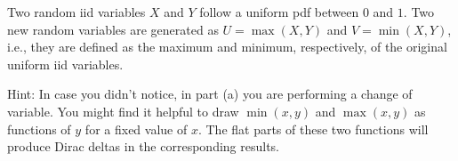 \else

\question[25] %

Two random iid variables $X$ and $Y$ follow a uniform pdf between $0$ and $1$. Two new random variables are generated as $U = \max(X,Y)$ and $V = \min(X,Y)$, i.e., they are defined as the maximum  and minimum, respectively, of the original uniform iid variables.


Hint: In case you didn't notice, in part (a)  you are performing a change of variable. You might find it helpful to draw $\min(x,y)$ and $\max(x,y)$ as functions of $y$ for a fixed value of $x$. The flat parts of these two functions will produce Dirac deltas in the corresponding results.

\begin{solution}
\end{solution}

\fi